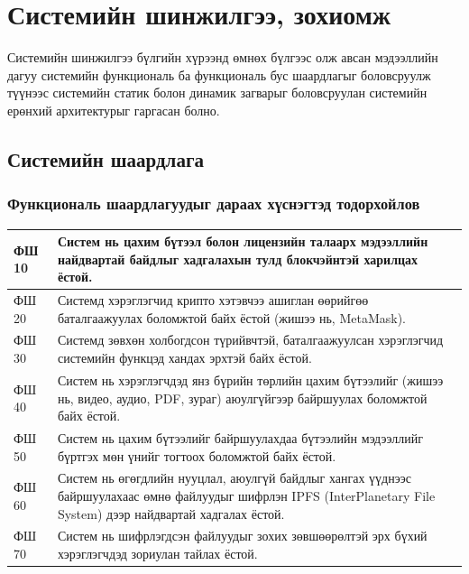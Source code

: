 \chapter{Системийн шинжилгээ, зохиомж}
Системийн шинжилгээ бүлгийн хүрээнд өмнөх бүлгээс олж авсан мэдээллийн дагуу системийн функциональ ба функциональ бус шаардлагыг боловсруулж түүнээс системийн статик болон динамик загварыг боловсруулан системийн ерөнхий архитектурыг гаргасан болно.

\section{Системийн шаардлага}
\subsection{Функциональ шаардлагуудыг дараах хүснэгтэд тодорхойлов}
\begin{table}[h!]
	\centering
   \begin{tabularx}{\textwidth}{|p{}|X|}
		\hline
      ФШ 10 & Систем нь цахим бүтээл болон лицензийн талаарх мэдээллийн найдвартай байдлыг хадгалахын тулд блокчэйнтэй харилцах ёстой.
      \\ \hline ФШ 20 & Системд хэрэглэгчид крипто хэтэвчээ ашиглан өөрийгөө баталгаажуулах боломжтой байх ёстой (жишээ нь, MetaMask).
      \\ \hline ФШ 30 & Системд зөвхөн холбогдсон түрийвчтэй, баталгаажуулсан хэрэглэгчид системийн функцэд хандах эрхтэй байх ёстой.
      \\ \hline ФШ 40 & Систем нь хэрэглэгчдэд янз бүрийн төрлийн цахим бүтээлийг (жишээ нь, видео, аудио, PDF, зураг) аюулгүйгээр байршуулах боломжтой байх ёстой.
      \\ \hline ФШ 50 & Систем нь цахим бүтээлийг байршуулахдаа бүтээлийн мэдээллийг бүртгэх мөн үнийг тогтоох боломжтой байх ёстой.
      \\ \hline ФШ 60 & Систем нь өгөгдлийн нууцлал, аюулгүй байдлыг хангах үүднээс байршуулахаас өмнө файлуудыг шифрлэн IPFS (InterPlanetary File System) дээр найдвартай хадгалах ёстой.
      \\ \hline ФШ 70 & Систем нь шифрлэгдсэн файлуудыг зохих зөвшөөрөлтэй эрх бүхий хэрэглэгчдэд зориулан тайлах ёстой.
      \\ \hline
	\end{tabularx}
\end{table}

